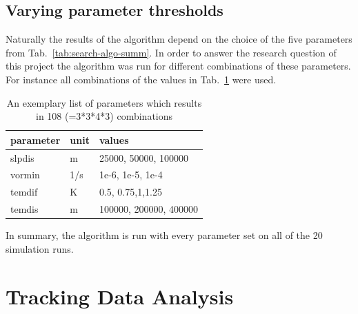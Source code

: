 \subsection{Varying parameter thresholds}
Naturally the results of the algorithm depend on the choice of the five
parameters from Tab.~\ref{tab:search-algo-summ}. In order to answer the
research question of this project the algorithm was run for different
combinations of these parameters. For instance all combinations of the values
in Tab.~\ref{tab:param_combos} were used.

\begin{table}[ht]
	\centering
	\begin{tabular}{|l|l|l|}
		\hline
		\textbf{parameter} & \textbf{unit} & \textbf{values}        \\ \hline
		slpdis             & m             & 25000, 50000, 100000   \\
		vormin             & 1/s           & 1e-6, 1e-5, 1e-4       \\
		temdif             & K             & 0.5, 0.75,1,1.25       \\
		temdis             & m             & 100000, 200000, 400000 \\ \hline
	\end{tabular}
	\caption{An exemplary list of parameters which results in 108 (=3*3*4*3) combinations }
	\label{tab:param_combos}
\end{table}
In summary, the algorithm is run with every parameter set on all of the 20
simulation runs.

\section{Tracking Data Analysis}
